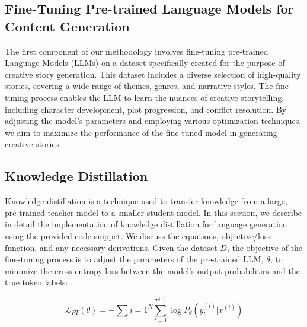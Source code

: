 \documentclass[letterpaper]{article}
\begin{document}
\subsection{Fine-Tuning Pre-trained Language Models for Content Generation}
The first component of our methodology involves fine-tuning pre-trained Language Models (LLMs) on a dataset specifically created for the purpose of creative story generation. This dataset includes a diverse selection of high-quality stories, covering a wide range of themes, genres, and narrative styles. The fine-tuning process enables the LLM to learn the nuances of creative storytelling, including character development, plot progression, and conflict resolution. By adjusting the model's parameters and employing various optimization techniques, we aim to maximize the performance of the fine-tuned model in generating creative stories.

\subsection{Knowledge Distillation}
Knowledge distillation is a technique used to transfer knowledge from a large, pre-trained teacher model to a smaller student model. In this section, we describe in detail the implementation of knowledge distillation for language generation using the provided code snippet. We discuss the equations, objective/loss function, and any necessary derivations.
Given the dataset $D$, the objective of the fine-tuning process is to adjust the parameters of the pre-trained LLM, $\theta$, to minimize the cross-entropy loss between the model's output probabilities and the true token labels:

\begin{equation}
\mathcal{L}_{FT}(\theta) = - \sum{i=1}^N \sum_{t=1}^{T^{(i)}} \log P_\theta(y_t^{(i)} | x^{(i)})
\end{equation}
\end{document}
